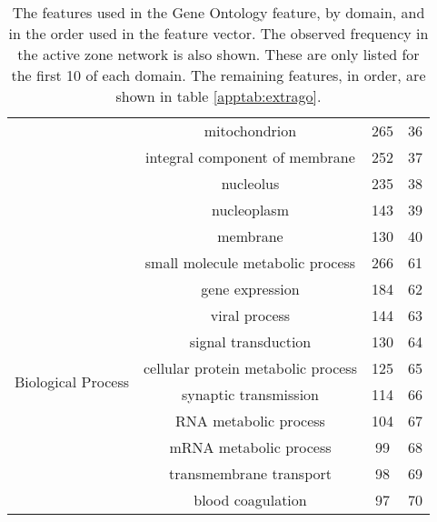 \begin{table}
\begin{tabular}{l c c c}
                                              & mitochondrion & 265 & 36 \\
                                              & integral component of membrane & 252 & 37 \\
                                              & nucleolus & 235 & 38 \\
                                              & nucleoplasm & 143 & 39 \\
                                              & membrane & 130 & 40 \\
        \hline
        \multirow{10}{*}{Biological Process}  & small molecule metabolic process & 266 & 61 \\
                                              & gene expression & 184 & 62 \\
                                              & viral process & 144 & 63 \\
                                              & signal transduction & 130 & 64 \\
                                              & cellular protein metabolic process & 125 & 65 \\
                                              & synaptic transmission & 114 & 66 \\
                                              & RNA metabolic process & 104 & 67 \\
                                              & mRNA metabolic process & 99 & 68 \\
                                              & transmembrane transport & 98 & 69 \\
                                              & blood coagulation & 97 & 70 \\
    \end{tabular}
    \caption{The features used in the Gene Ontology feature, by domain, and in the order used in the feature vector. The observed frequency in the active zone network is also shown. These are only listed for the first 10 of each domain. The remaining features, in order, are shown in table \ref{apptab:extrago}.}
    \label{apptab:go}
\end{table}


